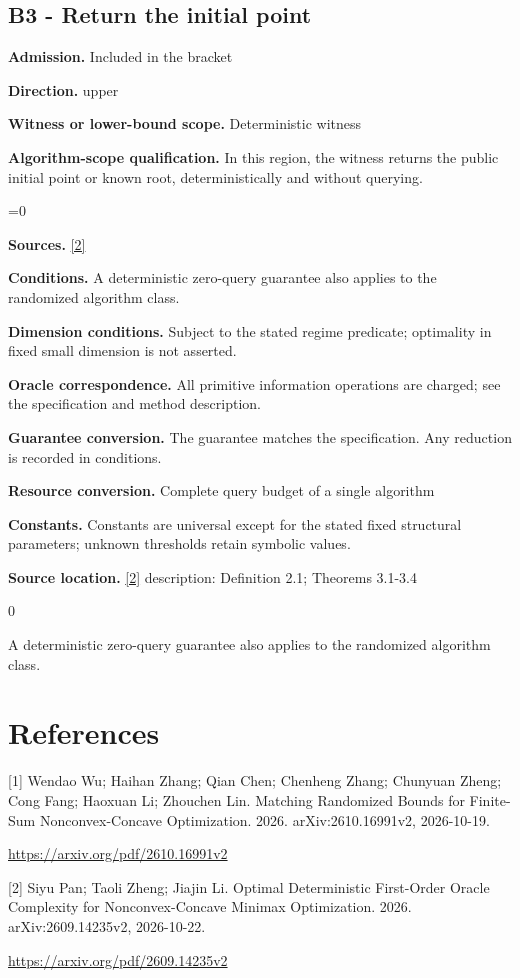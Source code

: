 \documentclass[10pt,a4paper]{article}
\newcommand{\AtlasMath}[1]{\par\begingroup\centering\setbox0=\hbox{$\displaystyle #1$}\ifdim\wd0>1.4\linewidth\typeout{ATLAS WIDE FORMULA: \the\wd0}\fi\ifdim\wd0>\linewidth\resizebox{\linewidth}{!}{\box0}\else\box0\fi\par\endgroup}
\begin{document}
\subsection{B3 - Return the initial point}
\textbf{Admission.} Included in the bracket

\textbf{Direction.} upper

\textbf{Witness or lower-bound scope.} Deterministic witness

\textbf{Algorithm-scope qualification.} In this region, the witness returns the public initial point or known root, deterministically and without querying.

\AtlasMath{0}
\textbf{Sources.} \href{https://arxiv.org/pdf/2609.14235v2}{[2]}

\textbf{Conditions.} A deterministic zero-query guarantee also applies to the randomized algorithm class.

\textbf{Dimension conditions.} Subject to the stated regime predicate; optimality in fixed small dimension is not asserted.

\textbf{Oracle correspondence.} All primitive information operations are charged; see the specification and method description.

\textbf{Guarantee conversion.} The guarantee matches the specification. Any reduction is recorded in conditions.

\textbf{Resource conversion.} Complete query budget of a single algorithm

\textbf{Constants.} Constants are universal except for the stated fixed structural parameters; unknown thresholds retain symbolic values.

\textbf{Source location.} \href{https://arxiv.org/pdf/2609.14235v2}{[2]} description: Definition 2.1; Theorems 3.1-3.4

0

A deterministic zero-query guarantee also applies to the randomized algorithm class.

\section{References}
[1] Wendao Wu; Haihan Zhang; Qian Chen; Chenheng Zhang; Chunyuan Zheng; Cong Fang; Haoxuan Li; Zhouchen Lin. Matching Randomized Bounds for Finite-Sum Nonconvex-Concave Optimization. 2026. arXiv:2610.16991v2, 2026-10-19.

\url{https://arxiv.org/pdf/2610.16991v2}

[2] Siyu Pan; Taoli Zheng; Jiajin Li. Optimal Deterministic First-Order Oracle Complexity for Nonconvex-Concave Minimax Optimization. 2026. arXiv:2609.14235v2, 2026-10-22.

\url{https://arxiv.org/pdf/2609.14235v2}
\end{document}
